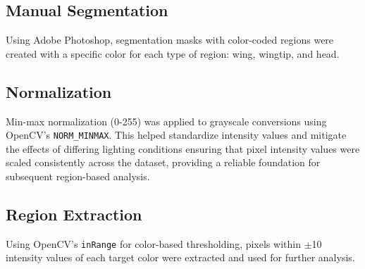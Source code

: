 \documentclass[a4paper,12pt]{report}
\begin{document}
\subsection{Manual Segmentation}
Using Adobe Photoshop, segmentation masks with color-coded regions were created with a specific color for each type of region: wing, wingtip, and head.

\subsection{Normalization}
Min-max normalization\citep{monzon_image_normalization} (0-255) was applied to grayscale conversions using OpenCV's \texttt{NORM\_MINMAX}.
This helped standardize intensity values and mitigate the effects of differing lighting conditions ensuring that pixel intensity values were scaled consistently across the dataset, providing a reliable foundation for subsequent region-based analysis.

\subsection{Region Extraction}

Using OpenCV's \texttt{inRange} for color-based thresholding, pixels within $\pm$10 intensity values of each target color were extracted and used for further analysis.







\end{document}
